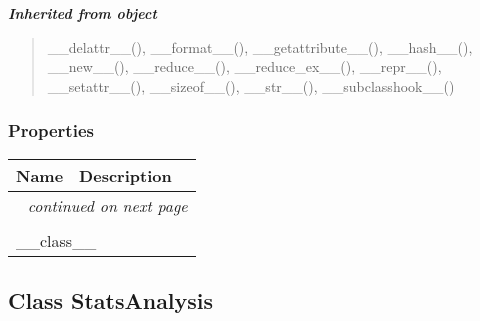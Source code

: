 \large{\textbf{\textit{Inherited from object}}}

\begin{quote}
\_\_delattr\_\_(), \_\_format\_\_(), \_\_getattribute\_\_(), \_\_hash\_\_(), \_\_new\_\_(), \_\_reduce\_\_(), \_\_reduce\_ex\_\_(), \_\_repr\_\_(), \_\_setattr\_\_(), \_\_sizeof\_\_(), \_\_str\_\_(), \_\_subclasshook\_\_()
\end{quote}


  \subsubsection{Properties}

    \vspace{-1cm}
\hspace{\varindent}\begin{longtable}{|p{\varnamewidth}|p{\vardescrwidth}|l}
\cline{1-2}
\cline{1-2} \centering \textbf{Name} & \centering \textbf{Description}& \\
\cline{1-2}
\endhead\cline{1-2}\multicolumn{3}{r}{\small\textit{continued on next page}}\\\endfoot\cline{1-2}
\endlastfoot\multicolumn{2}{|l|}{\textit{Inherited from object}}\\
\multicolumn{2}{|p{\varwidth}|}{\raggedright \_\_class\_\_}\\
\cline{1-2}
\end{longtable}



\subsection{Class StatsAnalysis}

